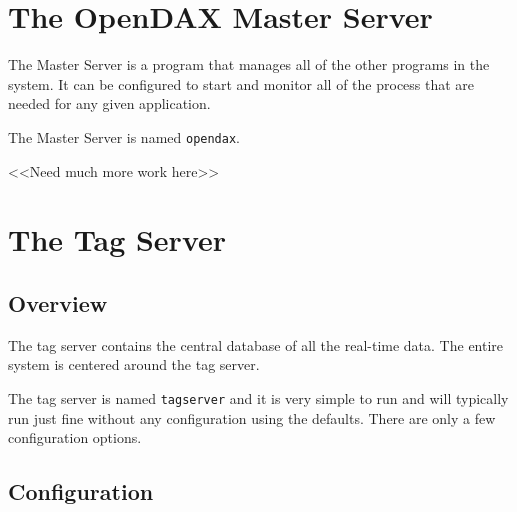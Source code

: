 	\chapter{The OpenDAX Master Server}

    The \opendax{} Master Server is a program that manages all of the
    other programs in the \opendax{} system.  It can be configured to
    start and monitor all of the process that are needed for any
    given application.

    The Master Server is named \texttt{opendax}.

    <<Need much more work here>>

	\chapter{The Tag Server}

    \section{Overview}
	The tag server contains the central database of all the real-time data.  The
	entire system is centered around the tag server.

	The tag server is named \texttt{tagserver} and it is very simple to run
	and will
	typically run just fine without any configuration using the defaults.  There are
	only a few configuration options.

    \section{Configuration}

